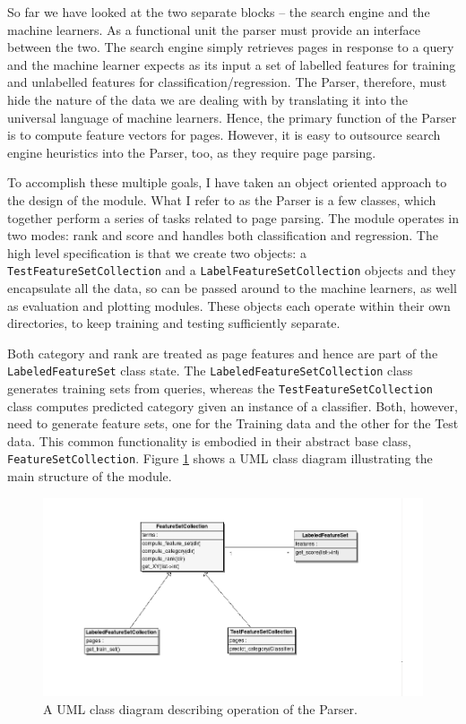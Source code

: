 \documentclass[12pt,notitlepage,twoside]{scrreprt}
\begin{document}
So far we have looked at the two separate blocks -- the search engine and the
machine learners. As a functional unit the parser must provide an interface
between the two. The search engine simply retrieves pages in response to a
query and the machine learner expects as its input a set of labelled features
for training and unlabelled features for classification/regression.  The
Parser, therefore, must hide the nature of the data we are dealing with by
translating it into the universal language of machine learners. Hence, the
primary function of the Parser is to compute feature vectors for pages.
However, it is easy to outsource search engine heuristics into the Parser, too,
as they require page parsing. 

To accomplish these multiple goals, I have
taken an object oriented approach to the design of the module. What I refer to
as the Parser is a few classes, which together perform a series of tasks
related to page parsing.  The module operates in two modes: rank and score and
handles both classification and regression. The high level specification is
that we create two objects: a \texttt{TestFeatureSetCollection} and a
\texttt{LabelFeatureSetCollection} objects and they encapsulate all the data,
so can be passed around to the machine learners, as well as evaluation and
plotting modules. These objects each operate within their own directories, to
keep training and testing sufficiently separate.

Both category and rank are
treated as page features and hence are part of the \texttt{LabeledFeatureSet}
class state.  The \texttt{LabeledFeatureSetCollection} class generates training
sets from queries, whereas the \texttt{TestFeatureSetCollection} class computes
predicted category given an instance of a classifier. Both, however, need to
generate feature sets, one for the Training data and the other for the Test
data. This common functionality is embodied in their abstract base class,
\texttt{FeatureSetCollection}.  Figure \ref{uml} shows a UML class diagram
illustrating the main structure of the module.

\begin{figure}[h!]
\centering
\includegraphics[scale=0.5]{figs/uml.png}
\caption{A UML class diagram describing operation of the Parser.}
\label{uml}
\end{figure}
\end{document}

